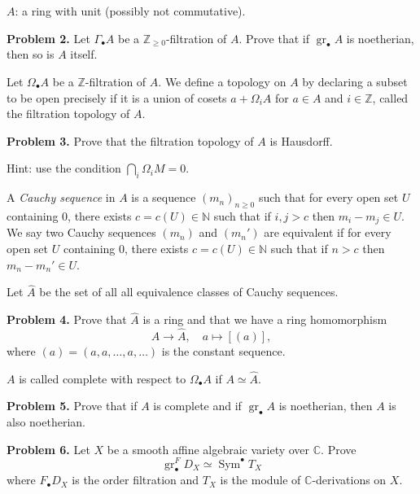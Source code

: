 \documentclass[12pt]{article}
\begin{document}
$A$: a ring with unit (possibly not commutative).

\bigskip
\noindent
\textbf{Problem 2.} Let $\Gamma_\bullet A$ be a $\mathbb{Z}_{\ge 0}$-filtration of $A$. Prove that if $\operatorname{gr}_\bullet A$
is noetherian, then so is $A$ itself.

\bigskip
Let $\Omega_\bullet A$ be a $\mathbb{Z}$-filtration of $A$. We define a topology on $A$ by declaring a subset to be
open precisely if it is a union of cosets $a + \Omega_i A$ for $a \in A$ and $i \in \mathbb{Z}$, called the filtration
topology of $A$.

\bigskip
\noindent
\textbf{Problem 3.} Prove that the filtration topology of $A$ is Hausdorff.

Hint: use the condition $\bigcap_i \Omega_i M = 0$.

\bigskip
A \emph{Cauchy sequence} in $A$ is a sequence $(m_n)_{n\ge 0}$ such that for every open set $U$ containing
$0$, there exists $c=c(U) \in \mathbb{N}$ such that if $i,j>c$ then $m_i-m_j \in U$. We say two Cauchy
sequences $(m_n)$ and $(m_n')$ are equivalent if for every open set $U$ containing $0$, there exists
$c=c(U) \in \mathbb{N}$ such that if $n>c$ then $m_n-m_n' \in U$.

Let $\widehat{A}$ be the set of all all equivalence classes of Cauchy sequences.

\bigskip
\noindent
\textbf{Problem 4.} Prove that $\widehat{A}$ is a ring and that we have a ring homomorphism
\[
A \to \widehat{A}, \quad a \mapsto [(a)],
\]
where $(a) = (a,a,\ldots,a,\ldots)$ is the constant sequence.

\bigskip
$A$ is called complete with respect to $\Omega_\bullet A$ if $A \simeq \widehat{A}$.

\bigskip
\noindent
\textbf{Problem 5.} Prove that if $A$ is complete and if $\operatorname{gr}_\bullet A$ is noetherian, then $A$ is also noetherian.

\bigskip
\noindent
\textbf{Problem 6.} Let $X$ be a smooth affine algebraic variety over $\mathbb{C}$. Prove
\[
\operatorname{gr}^F_\bullet D_X \simeq \operatorname{Sym}^\bullet T_X
\]
where $F_\bullet D_X$ is the order filtration and $T_X$ is the module of $\mathbb{C}$-derivations on $X$.
\end{document}
